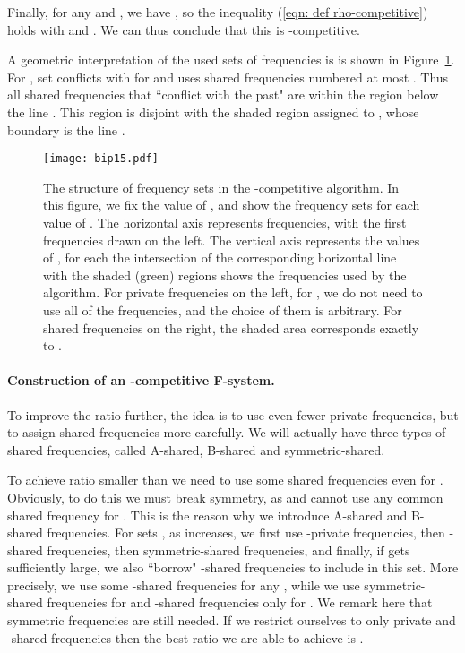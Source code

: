 \documentclass[11pt]{article}
\begin{document}
Finally, for any  and , we have
,
so the inequality (\ref{eqn: def rho-competitive}) holds with 
 and . We can thus conclude that this
 is -competitive.

\medskip

A geometric interpretation of the used sets of frequencies is is shown
in Figure~\ref{fig: shared frequencies 1.5}.  For , set
 conflicts with  for  and
 uses shared frequencies numbered at most . Thus all shared frequencies that ``conflict with the past"
are within the region below the line . This region is
disjoint with the shaded region assigned to , whose
boundary is the line .



\begin{figure}[t]
\begin{center}
\texttt{[image: bip15.pdf]}

\caption{The structure of frequency sets in the -competitive
algorithm.  In this figure, we fix the value of , and show the
frequency sets for each value of .  The horizontal axis
represents frequencies, with the first frequencies drawn on the left.
The vertical axis represents the values of , for each  the
intersection of the corresponding horizontal line with the shaded
(green) regions shows the frequencies used by the algorithm.  For
private frequencies on the left, for , we do not need to use
all of the frequencies, and the choice of them is arbitrary.  For
shared frequencies on the right, the shaded area corresponds exactly
to .  }
\label{fig: shared frequencies 1.5}
\end{center}
\end{figure}



\paragraph{Construction of an -competitive F-system.}

To improve the ratio further, the idea is to use even fewer private
frequencies, but to assign shared frequencies more carefully. We will
actually have three types of shared frequencies, called A-shared,
B-shared and symmetric-shared.  

To achieve ratio smaller than  we need to use some shared
frequencies even for . Obviously, to do this we must break
symmetry, as  and  cannot use any common shared
frequency for . This is the reason why we introduce A-shared
and B-shared frequencies.  For sets , as  increases, we
first use -private frequencies, then -shared frequencies, then
symmetric-shared frequencies, and finally, if  gets sufficiently
large, we also ``borrow" -shared frequencies to include in this
set. More precisely, we use some -shared frequencies for any
, while we use symmetric-shared frequencies
for  and -shared frequencies only for .  We remark here that symmetric frequencies are still
needed. If we restrict ourselves to only private and -shared
frequencies then the best ratio we are able to achieve is .
\end{document}
